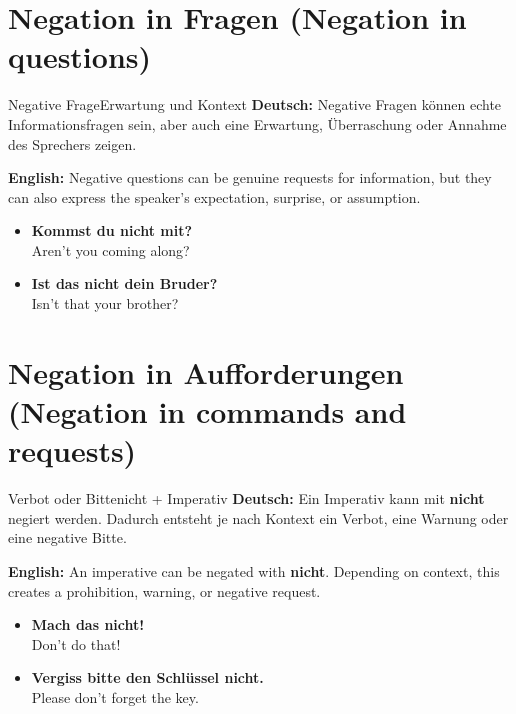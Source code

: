 \documentclass[a4paper,11pt]{article}
\newcommand{\GermanText}[1]{\textbf{Deutsch: }#1\par}
\newcommand{\EnglishText}[1]{{\small\color{SoftGray}\textbf{English: }#1\par}}
\newcommand{\ExampleItem}[2]{\item \textbf{#1}\\{\small\color{SoftGray}#2}}
\begin{document}
\section{Negation in Fragen \textnormal{(Negation in questions)}}
\begin{grammarentry}{Negative Frage}{Erwartung und Kontext}
\GermanText{Negative Fragen können echte Informationsfragen sein, aber auch eine Erwartung, Überraschung oder Annahme des Sprechers zeigen.}
\EnglishText{Negative questions can be genuine requests for information, but they can also express the speaker's expectation, surprise, or assumption.}
\end{grammarentry}
\begin{exbox}\begin{itemize}
\ExampleItem{Kommst du nicht mit?}{Aren't you coming along?}
\ExampleItem{Ist das nicht dein Bruder?}{Isn't that your brother?}
\end{itemize}\end{exbox}

\section{Negation in Aufforderungen \textnormal{(Negation in commands and requests)}}
\begin{grammarentry}{Verbot oder Bitte}{nicht + Imperativ}
\GermanText{Ein Imperativ kann mit \textbf{nicht} negiert werden. Dadurch entsteht je nach Kontext ein Verbot, eine Warnung oder eine negative Bitte.}
\EnglishText{An imperative can be negated with \textbf{nicht}. Depending on context, this creates a prohibition, warning, or negative request.}
\end{grammarentry}
\begin{exbox}\begin{itemize}
\ExampleItem{Mach das nicht!}{Don't do that!}
\ExampleItem{Vergiss bitte den Schlüssel nicht.}{Please don't forget the key.}
\end{itemize}\end{exbox}
\end{document}
